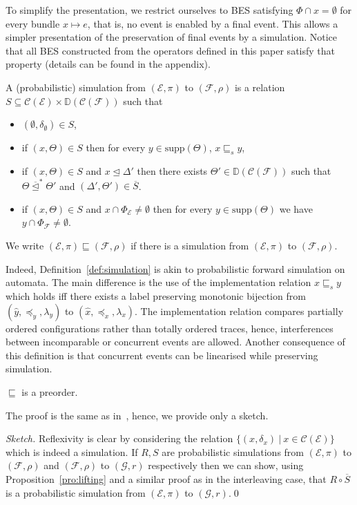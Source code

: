 \documentclass{llncs}
\newcommand{\C}{\mathcal{C}}
\newcommand{\D}{\mathbb{D}}
\newcommand{\EE}{\mathcal{E}}
\newcommand{\FF}{\mathcal{F}}
\newcommand{\G}{\mathcal{G}}
\newcommand{\refby}{\sqsubseteq}
\newcommand{\prefix}{\trianglelefteq}
\newcommand{\<}{\langle}
\renewcommand{\>}{\rangle}
\newcommand{\supp}{\mathrm{supp}}
\newcommand{\ov}[1]{\overline{#1}}
\newcommand{\exit}{\Phi}
\begin{document}
To simplify the presentation, we restrict ourselves to BES satisfying $\exit\cap x = \emptyset$ for every bundle $x\mapsto e$, that is, no event is enabled by a final event. This allows a simpler presentation of the preservation of final events by a simulation. Notice that all BES constructed from the operators defined in this paper satisfy that property (details can be found in the appendix).

\begin{definition}\label{def:simulation}
A (probabilistic) simulation from $(\EE,\pi)$ to $(\FF,\rho)$ is a relation $S\subseteq\C(\EE)\times\D(\C(\FF))$ such that
\begin{itemize}
\item $(\emptyset,\delta_\emptyset)\in S$,
\item if $(x,\Theta)\in S$ then for every $y\in\supp(\Theta)$, $x \refby_s y$,
\item if $(x,\Theta)\in S$ and $x\prefix\Delta'$ then there exists $\Theta'\in\D(\C(\FF))$ such that $\Theta\ov{\prefix}^*\Theta'$ and $(\Delta',\Theta')\in\ov{S}$.
\item if $(x,\Theta)\in S$ and $x\cap\exit_\EE\neq\emptyset$ then for every $y\in\supp(\Theta)$ we have $y\cap\exit_\FF\neq\emptyset$.
\end{itemize}
We write $(\EE,\pi)\refby(\FF,\rho)$ if there is a simulation from $(\EE,\pi)$ to $(\FF,\rho)$.
\end{definition}
Indeed, Definition~\ref{def:simulation} is akin to probabilistic forward simulation on automata. The main difference is the use of the implementation relation $x\refby_s y$ which holds iff there exists a label preserving monotonic bijection from $(\hat y,\preceq_{y},\lambda_{y})$ to $(\hat{x},\preceq_{x},\lambda_{x})$. The implementation relation compares partially ordered configurations rather than totally ordered traces, hence, interferences between incomparable or concurrent events are allowed. Another consequence of this definition is that concurrent events can be linearised while preserving simulation.

\begin{proposition}\label{pro:preorder}
$\refby$ is a preorder.
\end{proposition}

The proof is the same as in~\cite{Den07a}, hence, we provide only a sketch.

\begin{proof}[Sketch]
Reflexivity is clear by considering the relation $\{(x,\delta_x)\ |\ x\in\C(\EE)\}$ which is indeed a simulation. If $R,S$ are probabilistic simulations from $(\EE,\pi)$ to $(\FF,\rho)$ and $(\FF,\rho)$ to $(\G,r)$ respectively then we can show, using Proposition~\ref{pro:lifting} and a similar proof as in the interleaving case, that $R\circ\ov{S}$ is a probabilistic simulation from $(\EE,\pi)$ to $(\G,r)$.\qed 
\end{proof}
\end{document}

